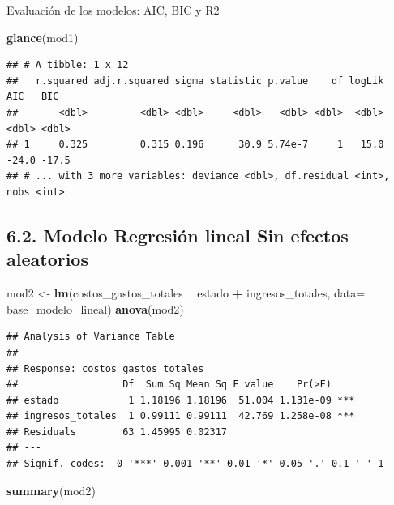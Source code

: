 \documentclass[
  11pt,
  a4paper,
]{book}
\newenvironment{Shaded}{\begin{snugshade}}{\end{snugshade}}
\newcommand{\DataTypeTok}[1]{\textcolor[rgb]{0.13,0.29,0.53}{#1}}
\newcommand{\KeywordTok}[1]{\textcolor[rgb]{0.13,0.29,0.53}{\textbf{#1}}}
\newcommand{\NormalTok}[1]{#1}
\newcommand{\OperatorTok}[1]{\textcolor[rgb]{0.81,0.36,0.00}{\textbf{#1}}}
\newcommand{\StringTok}[1]{\textcolor[rgb]{0.31,0.60,0.02}{#1}}
\begin{document}
Evaluación de los modelos: AIC, BIC y R2

\begin{Shaded}
\begin{Highlighting}[]
\KeywordTok{glance}\NormalTok{(mod1)}
\end{Highlighting}
\end{Shaded}

\begin{verbatim}
## # A tibble: 1 x 12
##   r.squared adj.r.squared sigma statistic p.value    df logLik   AIC   BIC
##       <dbl>         <dbl> <dbl>     <dbl>   <dbl> <dbl>  <dbl> <dbl> <dbl>
## 1     0.325         0.315 0.196      30.9 5.74e-7     1   15.0 -24.0 -17.5
## # ... with 3 more variables: deviance <dbl>, df.residual <int>, nobs <int>
\end{verbatim}

\hypertarget{modelo-regresiuxf3n-lineal-sin-efectos-aleatorios}{%
\subsection{6.2. Modelo Regresión lineal Sin efectos
aleatorios}\label{modelo-regresiuxf3n-lineal-sin-efectos-aleatorios}}

\begin{Shaded}
\begin{Highlighting}[]
\NormalTok{mod2 <-}\StringTok{ }\KeywordTok{lm}\NormalTok{(costos_gastos_totales }\OperatorTok{~}\StringTok{ }\NormalTok{estado }\OperatorTok{+}\StringTok{ }\NormalTok{ingresos_totales, }
           \DataTypeTok{data=}\NormalTok{ base_modelo_lineal) }
\KeywordTok{anova}\NormalTok{(mod2)}
\end{Highlighting}
\end{Shaded}

\begin{verbatim}
## Analysis of Variance Table
## 
## Response: costos_gastos_totales
##                  Df  Sum Sq Mean Sq F value    Pr(>F)    
## estado            1 1.18196 1.18196  51.004 1.131e-09 ***
## ingresos_totales  1 0.99111 0.99111  42.769 1.258e-08 ***
## Residuals        63 1.45995 0.02317                      
## ---
## Signif. codes:  0 '***' 0.001 '**' 0.01 '*' 0.05 '.' 0.1 ' ' 1
\end{verbatim}

\begin{Shaded}
\begin{Highlighting}[]
\KeywordTok{summary}\NormalTok{(mod2)}
\end{Highlighting}
\end{Shaded}
\end{document}
